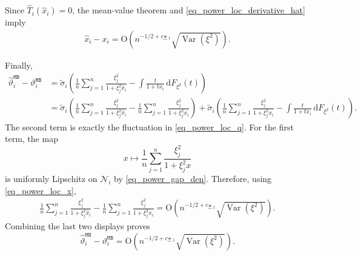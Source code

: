 \documentclass[12pt]{article}
\theoremstyle{plain}
\numberwithin{equation}{section}
\begin{document}
Since $\widehat{T}_i(\widehat{x}_i)=0$, the mean-value theorem and \eqref{eq_power_loc_derivative_hat} imply
\begin{align}\label{eq_power_loc_x}
	\widehat{x}_i-x_i
	=
	\mathrm{O}\!\left(n^{-1/2+c_{\Xi,1}}\sqrt{\operatorname{Var}(\xi^2)}\right).
\end{align}

Finally,
\begin{align*}
	\widehat{\vartheta}_i^{\mathtt{MB}}-\vartheta_i^{\mathtt{MB}}
	&=
	\widetilde{\sigma}_i
	\left(
	\frac{1}{n}\sum_{j=1}^n\frac{\xi_j^2}{1+\xi_j^2\widehat{x}_i}
	-
	\int\frac{t}{1+t x_i}\,\mathrm{d}F_{\xi^2}(t)
	\right)\\
	&=
	\widetilde{\sigma}_i
	\left(
	\frac{1}{n}\sum_{j=1}^n\frac{\xi_j^2}{1+\xi_j^2\widehat{x}_i}
	-
	\frac{1}{n}\sum_{j=1}^n\frac{\xi_j^2}{1+\xi_j^2x_i}
	\right)
	+
	\widetilde{\sigma}_i
	\left(
	\frac{1}{n}\sum_{j=1}^n\frac{\xi_j^2}{1+\xi_j^2x_i}
	-
	\int\frac{t}{1+t x_i}\,\mathrm{d}F_{\xi^2}(t)
	\right).
\end{align*}
The second term is exactly the fluctuation in \eqref{eq_power_loc_q}. For the first term, the map
\[
x\mapsto \frac{1}{n}\sum_{j=1}^n\frac{\xi_j^2}{1+\xi_j^2x}
\]
is uniformly Lipschitz on $\mathcal N_i$ by \eqref{eq_power_gap_den}. Therefore, using \eqref{eq_power_loc_x},
\begin{align*}
	\frac{1}{n}\sum_{j=1}^n\frac{\xi_j^2}{1+\xi_j^2\widehat{x}_i}
	-
	\frac{1}{n}\sum_{j=1}^n\frac{\xi_j^2}{1+\xi_j^2x_i}
	=
	\mathrm{O}\!\left(n^{-1/2+c_{\Xi,1}}\sqrt{\operatorname{Var}(\xi^2)}\right).
\end{align*}
Combining the last two displays proves
\[
\widehat{\vartheta}_i^{\mathtt{MB}}-\vartheta_i^{\mathtt{MB}}
=
\mathrm{O}\!\left(n^{-1/2+c_{\Xi,1}}\sqrt{\operatorname{Var}(\xi^2)}\right).
\]








 
\end{document}
